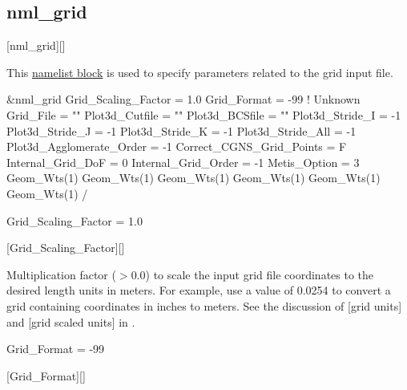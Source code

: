 \subsection{nml\_grid}
\label{SEC:nml_grid}
\inp*[nmlGrid]{}[nml\_grid][]

This \hyperref[SEC:User_Input]{namelist block}
is used to specify parameters related to the grid input file.

\begin{nmlblocklst}[
,label={LST:nml_grid}
,caption={Namelist nml\_grid.}
]
&nml_grid
  Grid_Scaling_Factor      =   1.0
  Grid_Format              =  -99  ! Unknown
  Grid_File                =  ""
  Plot3d_Cutfile           =  ""
  Plot3d_BCSfile           =  ""
  Plot3d_Stride_I          =  -1
  Plot3d_Stride_J          =  -1
  Plot3d_Stride_K          =  -1
  Plot3d_Stride_All        =  -1
  Plot3d_Agglomerate_Order =  -1
  Correct_CGNS_Grid_Points =   F
  Internal_Grid_DoF        =   0
  Internal_Grid_Order      =  -1
  Metis_Option             =   3
  Geom_Wts(1)%
  Geom_Wts(1)%
  Geom_Wts(1)%
  Geom_Wts(1)%
  Geom_Wts(1)%
  Geom_Wts(1)%
/
\end{nmlblocklst}


\begin{nmldescitem}
Grid_Scaling_Factor = 1.0
\end{nmldescitem}
[Grid\_Scaling\_Factor][]

\begin{nmldescbody}
Multiplication factor ($> 0.0$) to scale the input grid file coordinates to
the desired length units in meters.
%
For example, use a value of 0.0254 to convert a grid containing coordinates
in inches to meters.
%
See the discussion of
  [grid units]
and
  [grid scaled units]
in .
\end{nmldescbody}


\begin{nmldescitem}
Grid_Format = -99
\end{nmldescitem}
[Grid\_Format][]

